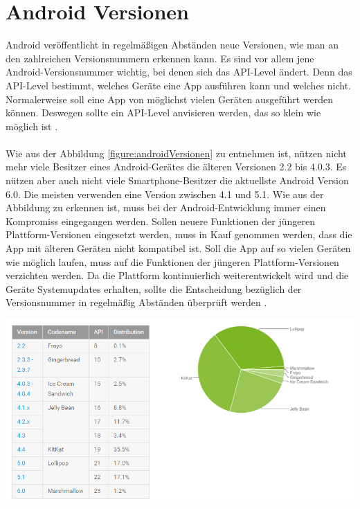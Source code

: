 \section{Android Versionen}
Android veröffentlicht in regelmäßigen Abständen neue Versionen, wie man an den zahlreichen Versionsnummern erkennen kann. Es sind vor allem jene Android-Versionsnummer wichtig, bei denen sich das API-Level ändert. Denn das API-Level bestimmt, welches Geräte eine App ausführen kann und welches nicht. Normalerweise soll eine App von möglichst vielen Geräten ausgeführt werden können. Deswegen sollte ein API-Level anvisieren werden, das so klein wie möglich ist \cite{gargenta:einfuhrung}.
\\\\
Wie aus der Abbildung \ref{figure:androidVersionen} zu entnehmen ist, nützen nicht mehr viele Besitzer eines Android-Gerätes die älteren Versionen 2.2 bis 4.0.3. Es nützen aber auch nicht viele Smartphone-Besitzer die aktuellste Android Version 6.0. Die meisten verwenden eine Version zwischen 4.1 und 5.1. Wie aus der Abbildung zu erkennen ist, muss bei der Android-Entwicklung 
immer einen Kompromiss eingegangen werden. Sollen neuere Funktionen der jüngeren Plattform-Versionen eingesetzt werden, muss in Kauf genommen werden, dass die App mit älteren Geräten nicht kompatibel ist. Soll die App auf so vielen Geräten wie möglich laufen, muss auf die Funktionen der jüngeren Plattform-Versionen verzichten werden. Da die Plattform kontinuierlich weiterentwickelt wird und die Geräte Systemupdates erhalten, sollte die Entscheidung bezüglich der Versionsnummer in regelmäßig Abständen überprüft werden \cite{gargenta:einfuhrung}.

\begin{minipage}{\textwidth} 
	\centering	
	\includegraphics[width=1\textwidth]{figures/android_versionen.png}
	\label{figure:androidVersionen}
	\vspace{2ex}
\end{minipage}
 

